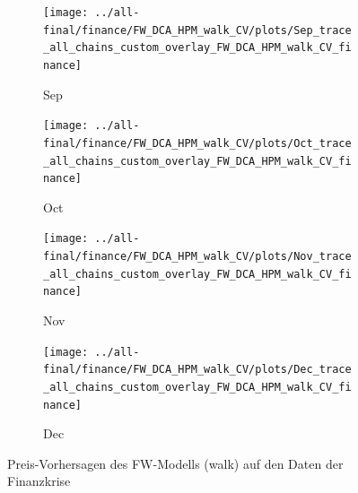 \documentclass[ngerman]{ttlab-qualify}
\begin{document}
\begin{figure}[H]
\begin{subfigure}{.3\linewidth}
  \texttt{[image: ../all-final/finance/FW\_DCA\_HPM\_walk\_CV/plots/Sep\_trace\_all\_chains\_custom\_overlay\_FW\_DCA\_HPM\_walk\_CV\_finance]}\hfill
  \caption{Sep}
  \end{subfigure}\par\medskip
  \begin{subfigure}{.3\linewidth}
  \texttt{[image: ../all-final/finance/FW\_DCA\_HPM\_walk\_CV/plots/Oct\_trace\_all\_chains\_custom\_overlay\_FW\_DCA\_HPM\_walk\_CV\_finance]}\hfill
  \caption{Oct}
  \end{subfigure}
  \begin{subfigure}{.3\linewidth}
  \texttt{[image: ../all-final/finance/FW\_DCA\_HPM\_walk\_CV/plots/Nov\_trace\_all\_chains\_custom\_overlay\_FW\_DCA\_HPM\_walk\_CV\_finance]}\hfill
  \caption{Nov}
  \end{subfigure}
  \begin{subfigure}{.3\linewidth}
  \texttt{[image: ../all-final/finance/FW\_DCA\_HPM\_walk\_CV/plots/Dec\_trace\_all\_chains\_custom\_overlay\_FW\_DCA\_HPM\_walk\_CV\_finance]}\hfill
  \caption{Dec}
  \end{subfigure}
  \caption{Preis-Vorhersagen des FW-Modells (walk) auf den Daten der Finanzkrise}
\end{figure}
\end{document}
